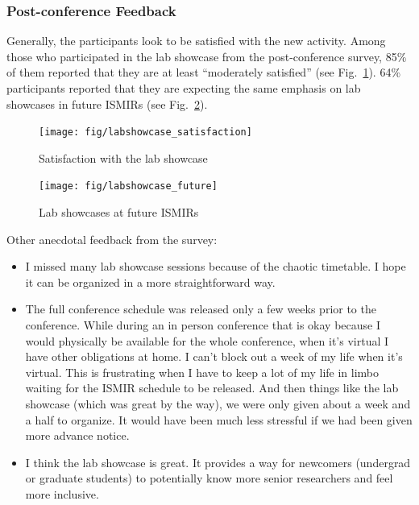 \documentclass[%
10pt,								%
titlepage,						%
]
{scrartcl}
\begin{document}
        \subsubsection{Post-conference Feedback}
            Generally, the participants look to be satisfied with the new activity. Among those who participated in the lab showcase from the post-conference survey, 85\% of them reported that they are at least ``moderately satisfied'' (see Fig.~\ref{fig:labshowcase_satisfaction}). 64\% participants reported that they are expecting the same emphasis on lab showcases in future ISMIRs (see Fig.~\ref{fig:labshowcase_future}).
        \begin{figure}%
            \centering
            \texttt{[image: fig/labshowcase\_satisfaction]}%
            \caption{Satisfaction with the lab showcase}%
            \label{fig:labshowcase_satisfaction}%
        \end{figure}
        \begin{figure}%
            \centering
            \texttt{[image: fig/labshowcase\_future]}%
            \caption{Lab showcases at future ISMIRs}%
            \label{fig:labshowcase_future}%
        \end{figure}
        
        Other anecdotal feedback from the survey:
        \begin{itemize}
            \item I missed many lab showcase sessions because of the chaotic timetable. I hope it can be organized in a more straightforward way.
            \item   The full conference schedule was released only a few weeks prior to the conference. While during an in person conference that is okay because I would physically be available for the whole conference, when it's virtual I have other obligations at home. I can't block out a week of my life when it's virtual. This is frustrating when I have to keep a lot of my life in limbo waiting for the ISMIR schedule to be released. And then things like the lab showcase (which was great by the way), we were only given about a week and a half to organize. It would have been much less stressful if we had been given more advance notice.
            \item   I think the lab showcase is great. It provides a way for newcomers (undergrad or graduate students) to potentially know more senior researchers and feel more inclusive.
        \end{itemize}
            
\end{document}

